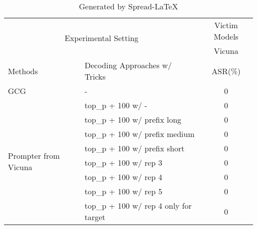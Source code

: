 \begin{table}[H]\centering
\caption{Generated by Spread-LaTeX}\label{tab: }
\scriptsize
\begin{tabular}{llc}\toprule
\multicolumn{2}{c}{\multirow{2}{*}{Experimental Setting}} &\multicolumn{1}{c}{Victim Models} \\
\cmidrule{3-3}
& & Vicuna\\
\midrule
Methods & Decoding Approaches w/ Tricks  & ASR(\%)\\
\midrule
GCG & - & 0 \\ %
\cmidrule{1-3} %
\multirow{8}{*}{Prompter from Vicuna} &top\_p + 100 w/ - &0 \\
&top\_p + 100 w/ prefix long &0 \\
&top\_p + 100 w/ prefix medium &0 \\
&top\_p + 100 w/ prefix short &0 \\
&top\_p + 100 w/ rep 3 &0 \\
&top\_p + 100 w/ rep 4 &0 \\
&top\_p + 100 w/ rep 5 &0 \\
&top\_p + 100 w/ rep 4 only for target &0 \\
\bottomrule
\end{tabular}
\end{table}
